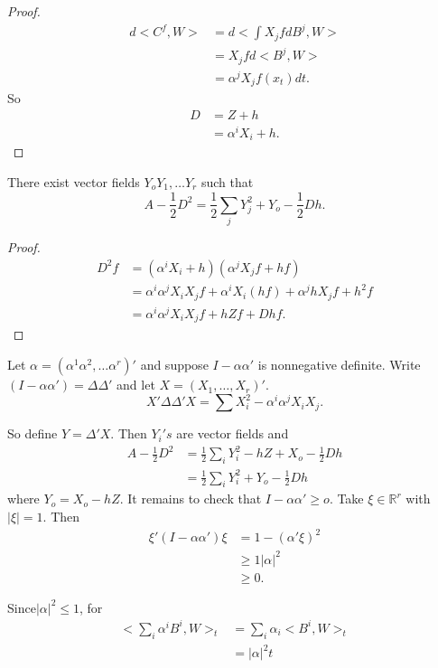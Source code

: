 \begin{proof}
  \begin{align*}
    d <C^f, W> & = d < \int X_j fd B^j, W>\\
    &= X_j fd < B^j, W> \\
    &= \alpha^j X_j f(x_t) dt.
  \end{align*}
  So\pageoriginale
  \begin{align*}
    D & = Z +h \\
    & = \alpha^i X_i + h.
  \end{align*}
\end{proof}

\begin{prop} %
  There exist vector fields $Y_o Y_1, \ldots Y_r$ such that
  $$
  A - \frac{1}{2} D^2 = \frac{1}{2} \sum_{j} Y^2_j + Y_o - \frac{1}{2} Dh.
  $$
\end{prop}

\begin{proof}
  \begin{align*}
    D^2 f & = ( \alpha^i X_i + h) ( \alpha^j X_j f + hf)\\
	  & = \alpha^i  \alpha^j X_i X_jf +  \alpha^i X_i (hf) +
    \alpha^j h X_j f + h^2f\\ 
    & = \alpha^i \alpha^j X_i X_j f + hZf + Dhf.
  \end{align*}
\end{proof}

Let $\alpha = (\alpha^1 \alpha^2, \ldots \alpha^r)'$ and suppose 
$I- \alpha \alpha'$ is nonnegative definite. Write $(I-
\alpha \alpha')= \Delta \Delta'$ and let $X=(X_1, \ldots, X_r)'$. 
$$
X' \Delta \Delta'X = \sum X^2_i -\alpha^i  \alpha^j X_i X_j.
$$

So define $Y= \Delta'X$. Then $Y_i 's$ are vector fields and 
\begin{align*}
  A - \frac{1}{2} D^2 & = \frac{1}{2} \sum_i Y^2_i - hZ + X_o -\frac{1}{2} Dh\\
  & = \frac{1}{2} \sum_i Y^2_i + Y_o - \frac{1}{2} Dh
\end{align*}
where $Y_o =X_o - hZ$. It remains to check that $I - \alpha \alpha'
\geq o$. Take $\xi \in  \mathbb{R}^r$ with $|\xi|=1$. Then  
\begin{align*}
  \xi' (I - \alpha \alpha') \xi & = 1 - (\alpha' \xi)^2\\
  & \geq 1 |\alpha|^2 \\
  & \geq 0.
\end{align*}

Since\pageoriginale $| \alpha |^2 \leq 1$, for 
\begin{align*}
  < \sum_i \alpha^i B^i, W>_t & = \sum_i \alpha_i< B^i, W>_t \\
  & = |\alpha|^2 t
\end{align*}

